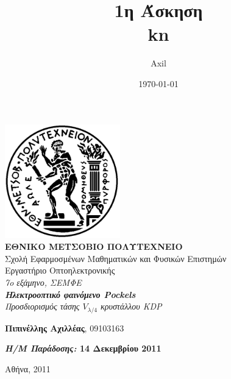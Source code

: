 \documentclass[a4paper,11pt,titlepage]{article}
\title{1η Άσκηση\\kn}
\author{Axil}
\date{\today}
\begin{document}
\pagestyle{headings}    %

\begin{titlepage}
\begin{center}
\includegraphics[width=50mm]{pyrforos.pdf}\\[0.5cm]
\textbf{\LARGE ΕΘΝΙΚΟ ΜΕΤΣΟΒΙΟ ΠΟΛΥΤΕΧΝΕΙΟ}\\
\textrm{\Large Σχολή Εφαρμοσμένων Μαθηματικών και Φυσικών Επιστημών}\\[2.0cm]
\Huge{Εργαστήριο Οπτοηλεκτρονικής}\\
\Large{\textit{7o εξάμηνο, ΣΕΜΦΕ}}\\[2.0cm]
\Large{\textit{\textbf{Ηλεκτροοπτικό φαινόμενο Pockels}\\Προσδιορισμός τάσης $V_{\lambda /4}$ κρυστάλλου KDP}}\\[5.0cm]
\normalsize
\begin{minipage}{0.49\textwidth}
\begin{flushleft}
\textbf{Πιπινέλλης Αχιλλέας}, 09103163
\end{flushleft}
\end{minipage}
\begin{minipage}{0.49\textwidth}
\begin{flushright}
\textbf{\textit{Η/Μ Παράδοσης:} 14 Δεκεμβρίου 2011}
\end{flushright}
\end{minipage}

\vfill
{Αθήνα, 2011}

\end{center}
\end{titlepage}

\end{document}
